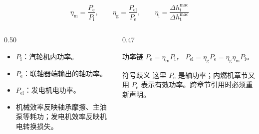 \begin{frame}[t,shrink]{}
$$
\eta_{\mathrm{m}}=\frac{P_{\mathrm{e}}}{P_{\mathrm{i}}},
\qquad
\eta_{\mathrm{g}}=\frac{P_{\mathrm{el}}}{P_{\mathrm{e}}},
\qquad
\eta_{\mathrm{i}}=\frac{\Delta h_{\mathrm{i}}^{\mathrm{mac}}}{\Delta h_{\mathrm{t}}^{\mathrm{mac}}}
$$
\begin{columns}[T,onlytextwidth]
\begin{column}{0.50\textwidth}
  \begin{itemize}
    \item \(P_{\mathrm{i}}\)：汽轮机内功率。
    \item \(P_{\mathrm{e}}\)：联轴器端输出的轴功率。
    \item \(P_{\mathrm{el}}\)：发电机电功率。
    \item 机械效率反映轴承摩擦、主油泵等耗功；发电机效率反映机电转换损失。
  \end{itemize}
\end{column}
\begin{column}{0.47\textwidth}
  \begin{keybox}{功率链}
  \small
  \(P_{\mathrm{e}}=\eta_{\mathrm{m}}P_{\mathrm{i}}\)，\quad
  \(P_{\mathrm{el}}=\eta_{\mathrm{g}}P_{\mathrm{e}}=\eta_{\mathrm{g}}\eta_{\mathrm{m}}P_{\mathrm{i}}\)。
  \end{keybox}
  \vspace{0.7mm}
  \begin{amberbox}{符号歧义}
  \small 这里 \(P_{\mathrm{e}}\) 是轴功率；内燃机章节又用 \(P_{\mathrm{e}}\) 表示有效功率。跨章节引用时必须重新声明。
  \end{amberbox}
\end{column}
\end{columns}
\end{frame}

